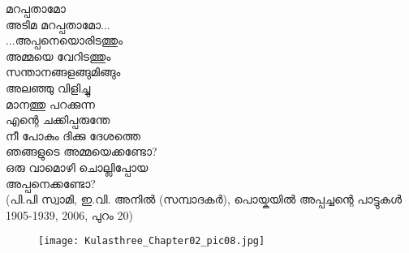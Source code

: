 \begin{tcolorbox}[%
  breakable, %
  arc=0mm, 
  left=1pt, right = 1pt, 
  boxrule=0mm,
  colback = {blue!10}, %
]
\begin{tcolorbox}{}
മറപ്പതാമോ\\
അടിമ മറപ്പതാമോ...\\
...അപ്പനെയൊരിടത്തും\\
അമ്മയെ വേറിടത്തും\\
സന്താനങ്ങളങ്ങുമിങ്ങും\\
അലഞ്ഞു വിളിച്ചു\\
മാനത്തു പറക്കുന്ന\\
എന്റെ ചക്കിപ്പരുന്തേ\\
നീ പോകും ദിക്കു ദേശത്തെ\\
ഞങ്ങളുടെ അമ്മയെക്കണ്ടോ?\\
ഒരു വാമൊഴി ചൊല്ലിപ്പോയ\\
അപ്പനെക്കണ്ടോ?\\
(പി.പി സ്വാമി, ഇ.വി. അനിൽ (സമ്പാദകർ), പൊയ്കയിൽ അപ്പച്ചന്റെ പാട്ടുകൾ 1905-1939, 2006, പുറം 20)
\end{tcolorbox}
\end{tcolorbox}

\begin{figure}[h]
\begin{center}
\texttt{[image: Kulasthree\_Chapter02\_pic08.jpg]}
\end{center}
\end{figure}

